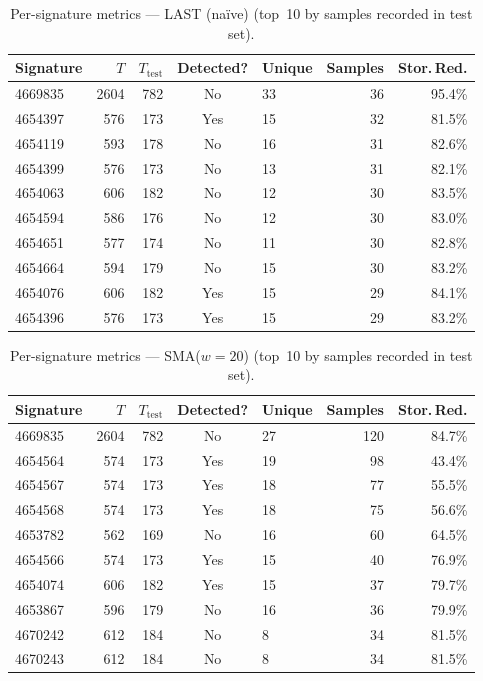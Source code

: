 \documentclass[11pt,a4paper]{article}
\begin{document}
\begin{table}[H]
\centering
\caption{Per-signature metrics --- LAST (na\"ive) (top~10 by samples recorded in test set).}
\label{tab:last_persig}
\begin{tabular}{lrrclrr}
\toprule
Signature & $T$ & $T_{\mathrm{test}}$ & Detected? & Unique & Samples & Stor.\,Red. \\
\midrule
  4669835 & 2604 & 782 & No & 33 & 36 & 95.4\% \\
  4654397 & 576 & 173 & Yes & 15 & 32 & 81.5\% \\
  4654119 & 593 & 178 & No & 16 & 31 & 82.6\% \\
  4654399 & 576 & 173 & No & 13 & 31 & 82.1\% \\
  4654063 & 606 & 182 & No & 12 & 30 & 83.5\% \\
  4654594 & 586 & 176 & No & 12 & 30 & 83.0\% \\
  4654651 & 577 & 174 & No & 11 & 30 & 82.8\% \\
  4654664 & 594 & 179 & No & 15 & 30 & 83.2\% \\
  4654076 & 606 & 182 & Yes & 15 & 29 & 84.1\% \\
  4654396 & 576 & 173 & Yes & 15 & 29 & 83.2\% \\
\bottomrule
\end{tabular}
\end{table}


\begin{table}[H]
\centering
\caption{Per-signature metrics --- SMA($w=20$) (top~10 by samples recorded in test set).}
\label{tab:sma_persig}
\begin{tabular}{lrrclrr}
\toprule
Signature & $T$ & $T_{\mathrm{test}}$ & Detected? & Unique & Samples & Stor.\,Red. \\
\midrule
  4669835 & 2604 & 782 & No & 27 & 120 & 84.7\% \\
  4654564 & 574 & 173 & Yes & 19 & 98 & 43.4\% \\
  4654567 & 574 & 173 & Yes & 18 & 77 & 55.5\% \\
  4654568 & 574 & 173 & Yes & 18 & 75 & 56.6\% \\
  4653782 & 562 & 169 & No & 16 & 60 & 64.5\% \\
  4654566 & 574 & 173 & Yes & 15 & 40 & 76.9\% \\
  4654074 & 606 & 182 & Yes & 15 & 37 & 79.7\% \\
  4653867 & 596 & 179 & No & 16 & 36 & 79.9\% \\
  4670242 & 612 & 184 & No & 8 & 34 & 81.5\% \\
  4670243 & 612 & 184 & No & 8 & 34 & 81.5\% \\
\bottomrule
\end{tabular}
\end{table}
\end{document}
